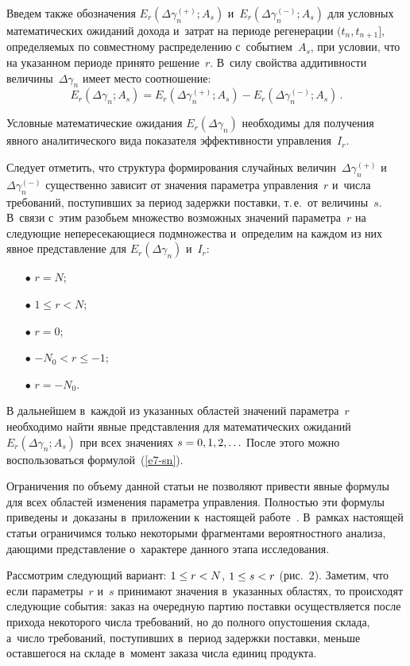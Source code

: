 \begin{multicols}{2}
  Введем также обозначения $E_r(\Delta\gamma_n^{(+)}; A_s)$ 
и~$E_r(\Delta\gamma_n^{(-)}; A_s)$ для условных математических ожиданий 
дохода и~за\-трат на периоде регенерации $(t_n,t_{n+1}]$, опре\-де\-ля\-емых по 
совместному рас\-пре\-де\-ле\-нию с~событием~$A_s$, при условии, что на 
указанном периоде принято решение~$r$. В~силу свойства ад\-ди\-тив\-ности 
величины~$\Delta\gamma_n$ имеет место соотношение:
  $$
  E_r\left(\Delta\gamma_n;A_s\right) =E_r\left( \Delta\gamma_n^{(+)}; A_s\right) 
-E_r\left( \Delta\gamma_n^{(-)};A_s\right)\,.
  $$
  
  Условные математические ожидания $E_r(\Delta\gamma_n)$ необходимы для 
получения явного аналитического вида показателя эффективности 
управ\-ле\-ния~$I_r$. 
  
  Следует отметить, что структура формирования случайных 
величин~$\Delta\gamma_n^{(+)}$ и~$\Delta\gamma_n^{(-)}$ существенно зависит 
от значения па\-ра\-мет\-ра управ\-ле\-ния~$r$ и~чис\-ла требований, поступивших за 
период за\-держ\-ки поставки, т.\,е.\ от величины~$s$. В~связи с~этим разобь\-ем 
множество возможных значений па\-ра\-мет\-ра~$r$ на сле\-ду\-ющие 
непересекающиеся подмножества и~определим на каж\-дом из них явное 
пред\-став\-ле\-ние для $E_r(\Delta\gamma_n)$ и~$I_r$:
  \begin{itemize}
  \item [$\bullet$] $r=N$;
  \item [$\bullet$] $1\leq r<N$;
  \item [$\bullet$] $r=0$;
  \item [$\bullet$] $-N_0<r\leq -1$;
  \item [$\bullet$] $r=-N_0$.
  \end{itemize}
  
  В дальнейшем в~каждой из указанных областей значений па\-ра\-мет\-ра~$r$ 
необходимо найти явные пред\-став\-ле\-ния для математических ожиданий 
$E_r(\Delta\gamma_n;A_s)$ при всех значениях $s\hm=0,1,2,\ldots$ После этого 
можно воспользоваться формулой~(\ref{e7-sn}).
  
  Ограничения по объему данной статьи не позволяют привести явные 
формулы для всех областей изменения па\-ра\-мет\-ра управ\-ле\-ния. Пол\-ностью эти 
формулы приведены и~доказаны в~приложении к~на\-сто\-ящей работе~\cite{5-sn}. 
В~рамках на\-сто\-ящей \mbox{статьи} ограничимся только некоторыми фрагментами 
вероятностного анализа, да\-ющи\-ми пред\-став\-ле\-ние о~характере данного этапа 
исследования.
  
  Рассмотрим следующий вариант: $1\hm\leq r\hm<N$, $1\hm\leq s\hm<r$ (рис.~2). 
Заметим, что если па\-ра\-мет\-ры~$r$ и~$s$ принимают значения в~указанных областях, 
то происходят сле\-ду\-ющие события: заказ на очередную пар\-тию поставки 
осуществляется после прихода некоторого чис\-ла требований, но до полного 
опус\-то\-ше\-ния склада, а~чис\-ло требований, поступивших в~период задержки 
по\-став\-ки, меньше оставшегося на складе в~момент заказа чис\-ла единиц 
продукта.




\end{multicols}
